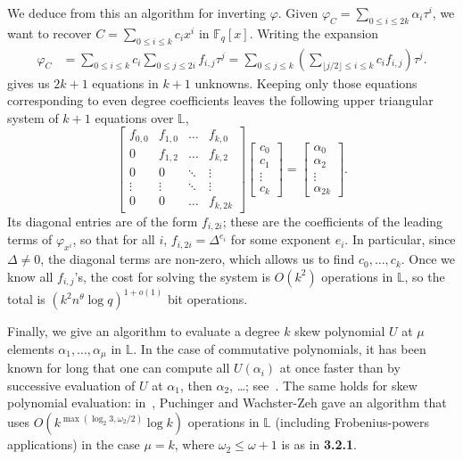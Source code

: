 \documentclass[sigconf]{acmart}
\newcommand{\F}{\mathbb{F}}
\renewcommand{\L}{\mathbb{L}}
\begin{document}
\smallskip{}  We deduce from this an algorithm for
inverting $\varphi$.  Given
$\varphi_C = \sum_{0 \le i \le 2k} \alpha_i \tau^i$, we want to
recover $C =\sum_{0 \le i \le k} c_ix^i $ in $\F_q[x]$. Writing the
expansion
\begin{align*}\label{eq:phic}
\varphi_C &= \sum_{0 \le i \le k} c_i \sum_{0 \le j \le 2i} f_{i,j} \tau^j = \sum_{0 \le j \le k}  \left (\sum_{\lfloor j/2\rfloor \le i \le k} c_i f_{i,j} \right) \tau^j.
\end{align*}
gives us $2k+1$ equations in $k+1$
unknowns. Keeping only those equations corresponding to even degree
coefficients leaves the following upper triangular system of $k + 1$
equations over $\L$,
\begin{equation}
\begin{bmatrix} f_{0,0} & f_{1,0} & \ldots & f_{k, 0} \\
                 0      & f_{1,2} & \ldots & f_{k, 2}  \\
                 0      & 0       & \ddots & \vdots                      \\
                 \vdots  & \vdots  &  \ddots      & \vdots                       \\
                 0  & 0 & \ldots & f_{k, 2k}
\end{bmatrix}
\begin{bmatrix}
  c_0 \\ c_1 \\ \vdots \\ c_k
\end{bmatrix} = \begin{bmatrix} \alpha_{0} \\ \alpha_{2} \\ \vdots \\ \alpha_{2k} \end{bmatrix}.
\end{equation}
Its diagonal entries are of the form $f_{i,2i}$; these are the
coefficients of the leading terms of $\varphi_{x^i}$, so that for all
$i$, $f_{i,2i} = \Delta^{e_i}$ for some exponent $e_i$. In particular,
since $\Delta \neq 0$, the diagonal terms are non-zero, which allows
us to find $c_0,\dots,c_{k}$. Once we know all $f_{i,j}$'s, the cost
for solving the system is $O(k^2)$ operations in $\L$, so the total is
$ (k^2 n^{\theta} \log q)^{1+o(1)}$ bit operations.

\smallskip{}  Finally, we give an algorithm to
evaluate a degree $k$ skew polynomial $U$ at $\mu$ elements
$\alpha_1,\dots,\alpha_\mu$ in $\L$. In the case of commutative
polynomials, it has been known for long that one can compute all
$U(\alpha_i)$ at once faster than by successive evaluation of $U$ at
$\alpha_1$, then $\alpha_2$, \dots;
see~\cite[Ch.~10]{Gathen:2003:MCA:945759}. The same holds for 
skew polynomial evaluation: in~\cite[Th.~15]{PUCHINGER2017b},
Puchinger and Wachster-Zeh gave an algorithm that uses
$O(k^{\max(\log_2 3, \omega_2/2)}\log k)$ operations in $\L$
(including Frobenius-powers applications) in the case $\mu=k$, where
$\omega_2 \le \omega+1$ is as in {\bf 3.2.1}.
\end{document}
